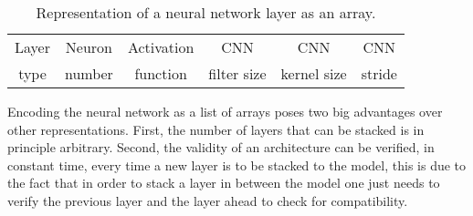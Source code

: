 \documentclass{article}
\begin{document}
\begin{table}[!htb]
\begin{center}
\begin{tabular}{| c | c | c | c | c | c |}
\hline
Layer & Neuron & Activation & CNN & CNN & CNN\\
type & number & function & filter size & kernel size & stride\\
\hline
\end{tabular}
\end{center}
\caption{Representation of a neural network layer as an array.}
\label{table:neural_network_array}
\end{table}

Encoding the neural network as a list of arrays poses two big advantages over other representations. First, the number of layers that can be stacked is in principle arbitrary. Second, the validity of an architecture can be verified, in constant time, every time a new layer is to be stacked to the model, this is due to the fact that in order to stack a layer in between the model one just needs to verify the previous layer and the layer ahead to check for compatibility.


\begin{comment}
Our proposal includes the comparisson of an evolutionary algorithm against sequential model based optimization for the selection of an optimal model, along with sampling and pruning techniques to only keep the most promising models and discard the rest of them. Furthermore, we propose to train multiple models simultaneously using Ray and perform bandit allocation resource to perform efficient resource allocation towards the most promising models. Our results will be fisrt tested using the CMAPSS dataset \cite{CMAPS2008} for regression and the MNIST dataset \cite{Lecun2010} for classification. A comparisson against AutoWEKA and Auto-sklearn (on the neural networks) will also be provided.
\end{comment}








\end{document}
